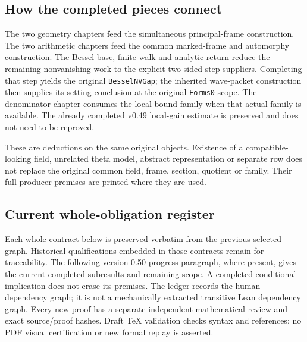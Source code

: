 \subsection{How the completed pieces connect}

The two geometry chapters feed the simultaneous principal-frame
construction. The two arithmetic chapters feed the common marked-frame
and automorphy construction. The Bessel base, finite walk and analytic
return reduce the remaining nonvanishing work to the explicit
two-sided step suppliers. Completing that step yields the original
\texttt{BesselNVGap}; the inherited wave-packet construction then
supplies its setting conclusion at the original \texttt{Forms0} scope.
The denominator chapter consumes the local-bound family when that
actual family is available. The already completed v0.49 local-gain
estimate is preserved and does not need to be reproved.

These are deductions on the same original objects. Existence of a
compatible-looking field, unrelated theta model, abstract representation
or separate row does not replace the original common field, frame,
section, quotient or family. Their full producer premises are printed
where they are used.

\subsection{Current whole-obligation register}

Each whole contract below is preserved verbatim from the previous
selected graph. Historical qualifications embedded in those contracts
remain for traceability. The following version-0.50 progress paragraph,
where present, gives the current completed subresults and remaining
scope. A completed conditional implication does not erase its premises.
The ledger records the human dependency graph; it is not a mechanically
extracted transitive Lean dependency graph. Every new proof has a
separate independent mathematical review and exact source/proof hashes.
Draft TeX validation checks syntax and references; no PDF visual
certification or new formal replay is asserted.

